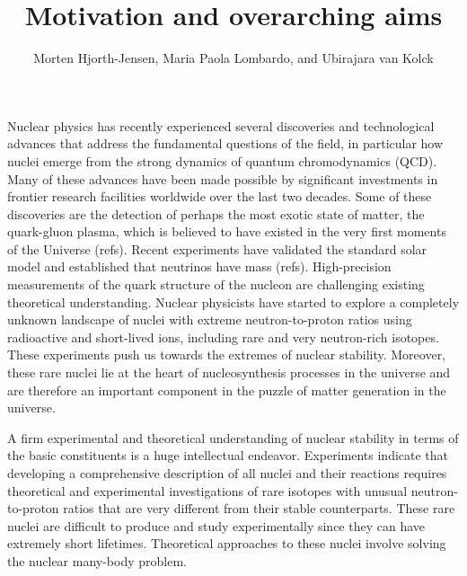 \title{Motivation and overarching aims}
\author{Morten Hjorth-Jensen, Maria Paola Lombardo, and Ubirajara van Kolck}
\maketitle






Nuclear physics has recently experienced several discoveries and
technological advances that address the fundamental questions of the
field, in particular how nuclei emerge from the strong dynamics
of quantum chromodynamics (QCD).
Many of these advances have been made possible by significant
investments in frontier research facilities worldwide over the last
two decades. Some of these discoveries are the detection of perhaps
the most exotic state of matter, the quark-gluon plasma, which is
believed to have existed in the very first moments of the Universe
(refs).  Recent experiments have validated the standard solar model
and established that neutrinos have mass (refs). High-precision
measurements of the quark structure of the nucleon are challenging
existing theoretical understanding.  Nuclear physicists have started
to explore a completely unknown landscape of nuclei with extreme
neutron-to-proton ratios using radioactive and short-lived ions,
including rare and very neutron-rich isotopes.  These experiments push
us towards the extremes of nuclear stability.  Moreover, these rare
nuclei lie at the heart of nucleosynthesis processes in the universe
and are therefore an important component in the puzzle of matter
generation in the universe.

A firm experimental and theoretical understanding of nuclear stability
in terms of the basic constituents is a huge intellectual endeavor.
Experiments indicate that developing a comprehensive description of
all nuclei and their reactions requires theoretical and experimental
investigations of rare isotopes with unusual neutron-to-proton ratios
that are very different from their stable counterparts.  These rare
nuclei are difficult to produce and study experimentally since they
can have extremely short lifetimes. Theoretical approaches to these
nuclei involve solving the nuclear many-body problem.

